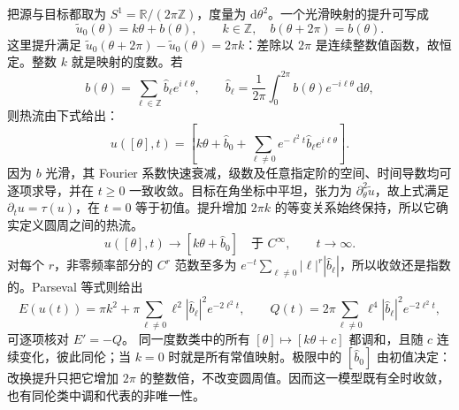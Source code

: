 \begin{example}\label{g3:exm:flat-circle-harmonic-heat-flow}
	把源与目标都取为 \(S^1=\mathbb R/(2\pi\mathbb Z)\)，度量为 \(\mathrm d\theta^2\)。一个光滑映射的提升可写成
	\[
		\widetilde u_0(\theta)=k\theta+b(\theta),
		\qquad k\in\mathbb Z,\quad b(\theta+2\pi)=b(\theta).
	\]
	这里提升满足 \(\widetilde u_0(\theta+2\pi)-\widetilde u_0(\theta)=2\pi k\)：差除以 \(2\pi\) 是连续整数值函数，故恒定。整数 \(k\) 就是映射的度数。若
	\[
		b(\theta)=\sum_{\ell\in\mathbb Z}\widehat b_\ell e^{i\ell\theta},
		\qquad
		\widehat b_\ell=\frac1{2\pi}\int_0^{2\pi}b(\theta)e^{-i\ell\theta}\,\mathrm d\theta,
	\]
	则热流由下式给出：
	\begin{equation}\label{g3:eq:circle-harmonic-heat-fourier}
		u([\theta],t)=\left[k\theta+\widehat b_0
		+\sum_{\ell\ne0}e^{-\ell^2t}\widehat b_\ell e^{i\ell\theta}\right].
	\end{equation}
	因为 \(b\) 光滑，其 Fourier 系数快速衰减，级数及任意指定阶的空间、时间导数均可逐项求导，并在 \(t\ge0\) 一致收敛。目标在角坐标中平坦，张力为 \(\partial_\theta^2\widetilde u\)，故上式满足 \(\partial_tu=\tau(u)\)，在 \(t=0\) 等于初值。提升增加 \(2\pi k\) 的等变关系始终保持，所以它确实定义圆周之间的热流。
	\[
		u([\theta],t)\longrightarrow[k\theta+\widehat b_0]
		\quad\text{于 }C^\infty,\qquad t\to\infty.
	\]
	对每个 \(r\)，非零频率部分的 \(C^r\) 范数至多为
	\(e^{-t}\sum_{\ell\ne0}|\ell|^r|\widehat b_\ell|\)，所以收敛还是指数的。Parseval 等式则给出
	\[
		E(u(t))=\pi k^2
		+\pi\sum_{\ell\ne0}\ell^2|\widehat b_\ell|^2e^{-2\ell^2t},
		\qquad
		Q(t)=2\pi\sum_{\ell\ne0}\ell^4|\widehat b_\ell|^2e^{-2\ell^2t},
	\]
	可逐项核对 \(E'=-Q\)。
	同一度数类中的所有 \([\theta]\mapsto[k\theta+c]\) 都调和，且随 \(c\) 连续变化，彼此同伦；当 \(k=0\) 时就是所有常值映射。极限中的 \([\widehat b_0]\) 由初值决定：改换提升只把它增加 \(2\pi\) 的整数倍，不改变圆周值。因而这一模型既有全时收敛，也有同伦类中调和代表的非唯一性。
\end{example}
